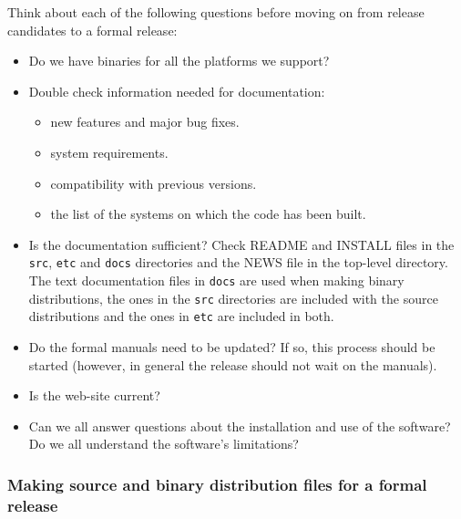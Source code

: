 \documentclass{dods-paper}
\begin{document}
Think about each of the following questions before moving on from release
candidates to a formal release:
\begin{itemize}
\item Do we have binaries for all the platforms we support?
\item Double check information needed for documentation:
  \begin{itemize}
  \item new features and major bug fixes.
  \item system requirements.
  \item compatibility with previous versions.
  \item the list of the systems on which the code has been built.
  \end{itemize}
\item Is the documentation sufficient? Check README and INSTALL files in the
  \texttt{src}, \texttt{etc} and \texttt{docs} directories and the NEWS file
  in the top-level directory. The text documentation files in \texttt{docs}
  are used when making binary distributions, the ones in the \texttt{src}
  directories are included with the source distributions and the ones in
  \texttt{etc} are included in both.
\item Do the formal manuals need to be updated? If so, this process should be
  started (however, in general the release should not wait on the manuals).
\item Is the web-site current?
\item Can we all answer questions about the installation and use of the
  software? Do we all understand the software's limitations?
\end{itemize}

\subsubsection{Making source and binary distribution files for a formal release}
\label{source-files}
\end{document}
